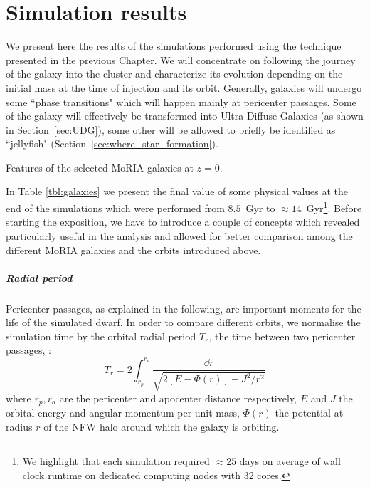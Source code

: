 
\chapter{Simulation results}
\label{ch:sim_results}

We present here the results of the simulations performed using the technique presented in the previous Chapter.
We will concentrate on following the journey of the galaxy into the cluster and characterize its evolution depending on the initial mass at the time of injection and its orbit.
Generally, galaxies will undergo some ``phase transitions" which will happen mainly at pericenter passages.
Some of the galaxy will effectively be transformed into Ultra Diffuse Galaxies (as shown in Section~\ref{sec:UDG}), some other will be allowed to briefly be identified as ``jellyfish" (Section~\ref{sec:where_star_formation}).

\begin{sidewaystable}
 \centering
 \footnotesize
 
 \caption{Features of the selected MoRIA galaxies at $z=0$.} \label{tbl:galaxies}
\end{sidewaystable}

In Table \ref{tbl:galaxies} we present the final value of some physical values at the end of the simulations which were performed from $8.5$~Gyr to $\approx 14$~Gyr\footnote{We highlight that each simulation required $\approx 25$ days on average of wall clock runtime on dedicated computing nodes with 32 cores.
}.
Before starting the exposition, we have to introduce a couple of concepts which revealed particularly useful in the analysis and allowed for better comparison among the different MoRIA galaxies and the orbits introduced above.

\paragraph*{Radial period}
Pericenter passages, as explained in the following, are important moments for the life of the simulated dwarf.
In order to compare different orbits, we normalise the simulation time by the orbital radial period $T_r$, \ie{} the time between two pericenter passages, \citep[p.~146]{BinneyTremaine2008}:
\begin{equation}
    T_r = 2 \int^{r_a}_{r_p} \frac{\dd r}{\sqrt{2\left[E-\Phi(r) \right] - J^2/r^2}}
    \label{eq:radial_period}
\end{equation}
where $r_p, r_a$ are the pericenter and apocenter distance respectively, $E$ and $J$ the orbital energy and angular momentum per unit mass, $\Phi(r)$ the potential at radius $r$ of the NFW halo around which the galaxy is orbiting.

